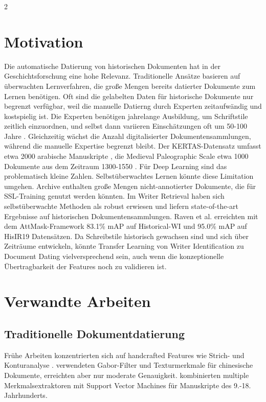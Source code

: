 \documentclass[12pt,a4paper]{article}
\begin{document}
\begin{multicols}{2}

\section{Motivation}

Die automatische Datierung von historischen Dokumenten hat in der Geschichtsforschung eine hohe Relevanz. Traditionelle Ansätze basieren auf überwachten Lernverfahren, die große Mengen bereits datierter Dokumente zum Lernen benötigen. Oft sind die gelabelten Daten für historische Dokumente nur begrenzt verfügbar, weil die manuelle Datierng durch Experten zeitaufwändig und kostspielig ist. Die Experten benötigen jahrelange Ausbildung, um Schriftstile zeitlich einzuordnen, und selbst dann variieren Einschätzungen oft um 50-100 Jahre \cite{schomaker2007}. Gleichzeitig wächst die Anzahl digitalisierter Dokumentensammlungen, während die manuelle Expertise begrenzt bleibt. Der KERTAS-Datensatz umfasst etwa 2000 arabische Manuskripte \cite{hassaine2013}, die Medieval Paleographic Scale etwa 1000 Dokumente aus dem Zeitraum 1300-1550 \cite{university2019}. Für Deep Learning sind das problematisch kleine Zahlen. Selbstüberwachtes Lernen könnte diese Limitation umgehen. Archive enthalten große Mengen nicht-annotierter Dokumente, die für SSL-Training genutzt werden könnten. Im Writer Retrieval haben sich selbstüberwachte Methoden als robust erwiesen und liefern state-of-the-art Ergebnisse auf historischen Dokumentensammlungen. Raven et al. \cite{raven2024} erreichten mit dem AttMask-Framework 83.1\% mAP auf Historical-WI und 95.0\% mAP auf HisIR19 Datensätzen. Da Schreibstile historisch gewachsen sind und sich über Zeiträume entwickeln, könnte Transfer Learning von Writer Identification zu Document Dating vielversprechend sein, auch wenn die konzeptionelle Übertragbarkeit der Features noch zu validieren ist.

\section{Verwandte Arbeiten}

\subsection{Traditionelle Dokumentdatierung}

Frühe Arbeiten konzentrierten sich auf handcrafted Features wie Strich- und Konturanalyse \cite{kleber2013}. \cite{he2014} verwendeten Gabor-Filter und Texturmerkmale für chinesische Dokumente, erreichten aber nur moderate Genauigkeit. \cite{ghosh2016} kombinierten multiple Merkmalsextraktoren mit Support Vector Machines für Manuskripte des 9.-18. Jahrhunderts.


\end{multicols}
\end{document}
